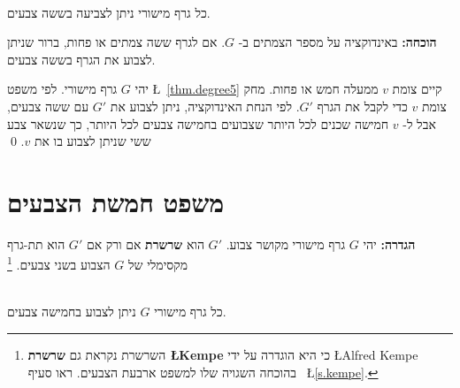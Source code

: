 \begin{theorem}\label{thm.sixcolor}\mbox{}\\
כל גרף מישורי ניתן לצביעה בששה צבעים.
\end{theorem}
\textbf{הוכחה:}
באינדוקציה על מספר הצמתים ב-%
$G$.
אם לגרף ששה צמתים או פחות, ברור שניתן לצבוע את הגרף בששה צבעים.

יהי
$G$
גרף מישורי. לפי משפט
\L{~\ref{thm.degree5}}
קיים צומת
$v$
ממעלה חמש או פחות. מחק צומת
$v$
כדי לקבל את הגרף
$G'$.
לפי הנחת האינדוקציה, ניתן לצבוע את
$G'$
עם ששה צבעים, אבל ל-%
$v$
חמישה שכנים לכל היותר שצבועים בחמישה 
צבעים לכל היותר, כך שנשאר צבע ששי שניתן לצבוע בו את
$v$. \qed

\begin{center}

\end{center}



\section{משפט חמשת הצבעים}

\textbf{הגדרה:}
יהי
$G$
גרף מישורי מקושר צבוע. 
$G'$
הוא
\textbf{שרשרת}
אם ורק אם
$G'$
הוא תת-גרף מקסימלי של
$G$
הצבוע בשני צבעים.%
\footnote{%
השרשרת נקראת גם
\textbf{שרשרת \L{Kempe}}
כי היא הוגדרה על ידי
\L{Alfred Kempe}
בהוכחה השגויה שלו למשפט ארבעת הצבעים. ראו סעיף~%
\L{\ref{s.kempe}}.}

\begin{theorem}\label{thm.fivecolor}\mbox{}\\
כל גרף מישורי 
$G$
ניתן לצבוע בחמישה צבעים.
\end{theorem}

